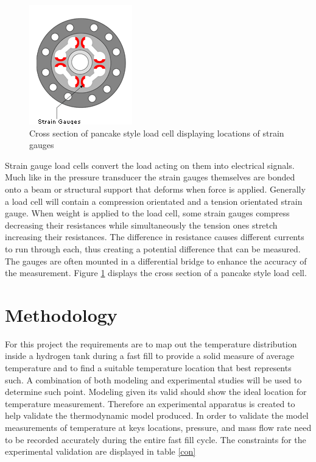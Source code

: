 \documentclass[paper=a4, fontsize=11pt, abstract=on]{scrartcl}
\numberwithin{equation}{section}		%
\numberwithin{figure}{section}			%
\numberwithin{table}{section}				%
\begin{document}
\begin{figure}[H]
\centering
\includegraphics[width=0.3\linewidth]{loads}
\caption{Cross section of pancake style load cell displaying locations of strain gauges}
\label{loads}
\end{figure}


Strain gauge load cells convert the load acting on them into electrical signals. Much like in the pressure transducer the strain gauges themselves are bonded onto a beam or structural support that deforms when force is applied. Generally a load cell will contain a compression orientated and a tension orientated strain gauge. When weight is applied to the load cell, some strain gauges compress decreasing their resistances while simultaneously the tension ones stretch increasing their resistances. The difference in resistance causes different currents to run through each, thus creating a potential difference that can be measured. The gauges are often mounted in a differential bridge to enhance the accuracy of the measurement. Figure \ref{loads} displays the cross section of a pancake style load cell.



\section{Methodology}

For this project the requirements are to map out the temperature distribution inside a hydrogen tank during a fast fill to provide a solid measure of average temperature and to find a suitable temperature location that best represents such. A combination of both modeling and experimental studies will be used to determine such point. Modeling given its valid should show the ideal location for temperature measurement. Therefore an experimental apparatus is created to help validate the thermodynamic model produced. In order to validate the model measurements of temperature at keys locations, pressure, and mass flow rate need to be recorded accurately during the entire fast fill cycle. The constraints for the experimental validation are displayed in table \ref{con}
\end{document}
